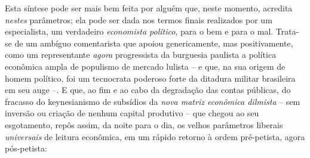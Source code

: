 Esta síntese pode ser mais bem feita por alguém que, neste momento,
acredita \emph{nestes} parâmetros; ela pode ser dada nos termos finais
realizados por um especialista, um verdadeiro \emph{economista
político}, para o bem e para o mal. Trata-se de um ambíguo comentarista
que apoiou genericamente, mas positivamente, como um representante
\emph{agora} progressista da burguesia paulista a política econômica
ampla de populismo de mercado lulista -- e que, na sua origem de homem
político, foi um tecnocrata poderoso forte da ditadura militar
brasileira em seu auge --. E que, ao fim e ao cabo da degradação das
contas públicas, do fracasso do keynesianismo de subsídios da \emph{nova
matriz econômica dilmista} -- sem inversão ou criação de nenhum capital
produtivo -- que chegou ao seu esgotamento, repôs assim, da noite para o
dia, os velhos parâmetros liberais \emph{universais} de leitura
econômica, em um rápido retorno à ordem pré-petista, agora pós-petista:

